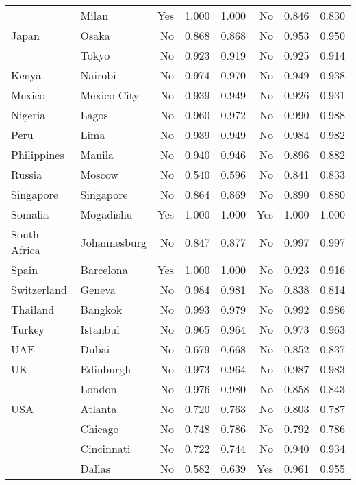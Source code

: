 \begin{tabular}{ l l r r r r r r  }
& Milan &      Yes &  1.000 &  1.000 &       No &  0.846 &  0.830 \\
Japan & Osaka &       No &  0.868 &  0.868 &       No &  0.953 &  0.950 \\
& Tokyo &       No &  0.923 &  0.919 &       No &  0.925 &  0.914 \\
Kenya & Nairobi &       No &  0.974 &  0.970 &       No &  0.949 &  0.938 \\
Mexico & Mexico City &       No &  0.939 &  0.949 &       No &  0.926 &  0.931 \\
Nigeria & Lagos &       No &  0.960 &  0.972 &       No &  0.990 &  0.988 \\
Peru & Lima &       No &  0.939 &  0.949 &       No &  0.984 &  0.982 \\
Philippines & Manila &       No &  0.940 &  0.946 &       No &  0.896 &  0.882 \\
Russia & Moscow &       No &  0.540 &  0.596 &       No &  0.841 &  0.833 \\
Singapore & Singapore &       No &  0.864 &  0.869 &       No &  0.890 &  0.880 \\
Somalia & Mogadishu &      Yes &  1.000 &  1.000 &      Yes &  1.000 &  1.000 \\
South Africa & Johannesburg &       No &  0.847 &  0.877 &       No &  0.997 &  0.997 \\
Spain & Barcelona &      Yes &  1.000 &  1.000 &       No &  0.923 &  0.916 \\
Switzerland & Geneva &       No &  0.984 &  0.981 &       No &  0.838 &  0.814 \\
Thailand & Bangkok &       No &  0.993 &  0.979 &       No &  0.992 &  0.986 \\
Turkey & Istanbul &       No &  0.965 &  0.964 &       No &  0.973 &  0.963 \\
UAE & Dubai &       No &  0.679 &  0.668 &       No &  0.852 &  0.837 \\
UK & Edinburgh &       No &  0.973 &  0.964 &       No &  0.987 &  0.983 \\
& London &       No &  0.976 &  0.980 &       No &  0.858 &  0.843 \\
USA & Atlanta &       No &  0.720 &  0.763 &       No &  0.803 &  0.787 \\
& Chicago &       No &  0.748 &  0.786 &       No &  0.792 &  0.786 \\
& Cincinnati &       No &  0.722 &  0.744 &       No &  0.940 &  0.934 \\
& Dallas &       No &  0.582 &  0.639 &      Yes &  0.961 &  0.955 \\

\end{tabular}

